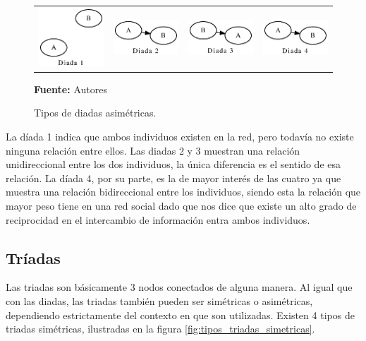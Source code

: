 \begin{figure}[!htb]
  \begin{center}
      \begin{tabular}{m{3cm}|m{3cm}|m{3cm}|m{3cm}}
        \includegraphics[width=3cm]{./imagenes/diada_1.eps} & 
        \includegraphics[width=3cm]{./imagenes/diada_2.eps} & 
        \includegraphics[width=3cm]{./imagenes/diada_3.eps} & 
        \includegraphics[width=3cm]{./imagenes/diada_4.eps}\\
      \end{tabular}
    \caption{Tipos de diadas asimétricas.}
    \label{fig:tipos_diadas}
    \textbf{Fuente:}  Autores
  \end{center}
\end{figure}


La díada 1 indica que ambos individuos existen en la red, pero todavía no existe ninguna relación entre ellos. Las diadas 2 y 3 muestran una relación unidireccional entre los dos individuos, la única diferencia es el sentido de esa relación. La díada 4, por su parte, es la de mayor interés de las cuatro ya que muestra una relación bidireccional entre los individuos, siendo esta la relación que mayor peso tiene en una red social dado que nos dice que existe un alto grado de reciprocidad en el intercambio de información entra ambos individuos.

\subsection{Tríadas}

Las triadas son básicamente 3 nodos conectados de alguna manera. Al igual que con las diadas, las triadas también pueden ser simétricas o asimétricas, dependiendo estrictamente del contexto en que son utilizadas. Existen 4 tipos de triadas simétricas, ilustradas en la figura \ref{fig:tipos_triadas_simetricas}.

